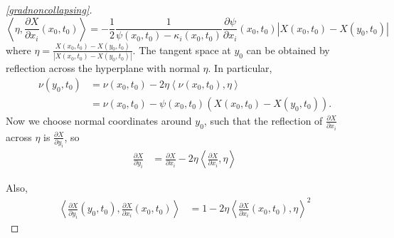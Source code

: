 \begin{proof}[\cref{gradnoncollapsing}]

    \begin{equation}
        \left< \eta, \frac{\partial X}{\partial x_{i}}(x_{0},t_{0}) \right> = -\frac{1}{2} \frac{1}{\psi(x_{0},t_{0})-\kappa_{i}(x_{0},t_{0})} \frac{\partial \psi}{\partial x_{i}}(x_{0},t_{0}) |X(x_{0},t_{0})-X(y_{0},t_{0})| \label{psiequation}
    \end{equation}
    where $ \eta = \frac{X(x_{0},t_{0})-X(y_{0},t_{0})}{|X(x_{0},t_{0})-X(y_{0},t_{0})|} $. The tangent space at $ y_{0} $ can be obtained by reflection across the hyperplane with normal $ \eta $. In particular, \begin{align}
        \nu(y_{0},t_{0}) &= \nu(x_{0},t_{0}) - 2 \eta \left< \nu(x_{0},t_{0}), \eta \right> \nonumber\\ 
        & = \nu(x_{0},t_{0}) - \psi(x_{0},t_{0})(X(x_{0},t_{0})-X(y_{0},t_{0})). \label{etay}
    \end{align}
    Now we choose normal coordinates around $ y_{0} $, such that the reflection of $ \frac{\partial X}{\partial x_{i}} $ across $ \eta $ is $ \frac{\partial X}{\partial y_{i}} $, so \begin{align}
        \frac{\partial X}{\partial y_{i}} & = \frac{\partial X}{\partial x_{i}} - 2 \eta \left< \frac{\partial X}{\partial x_{i}}, \eta \right>
    \end{align}

    Also,\begin{align}
        \left< \frac{\partial X}{\partial y_{i}}(y_{0},t_{0}), \frac{\partial X}{\partial x_{i}}(x_{0},t_{0}) \right> & = 1-2 \eta \left< \frac{\partial X}{\partial x_{i}}(x_{0},t_{0}), \eta \right>^{2} \label{innerproduct}
    \end{align}



\end{proof}
